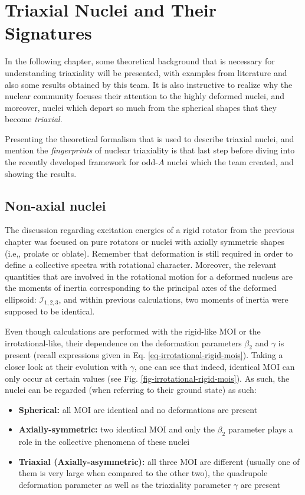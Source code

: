 \chapter{Triaxial Nuclei and Their Signatures}

In the following chapter, some theoretical background that is necessary for understanding triaxiality will be presented, with examples from literature and also some results obtained by this team. It is also instructive to realize why the nuclear community focuses their attention to the highly deformed nuclei, and moreover, nuclei which depart so much from the spherical shapes that they become \emph{triaxial}.

Presenting the theoretical formalism that is used to describe triaxial nuclei, and mention the \emph{fingerprints} of nuclear triaxiality is that last step before diving into the recently developed framework for odd-$A$ nuclei which the team created, and showing the results. 

\section{Non-axial nuclei}

The discussion regarding excitation energies of a rigid rotator from the previous chapter was focused on pure rotators or nuclei with axially symmetric shapes (i.e,, prolate or oblate). Remember that deformation is still required in order to define a collective spectra with rotational character. Moreover, the relevant quantities that are involved in the rotational motion for a deformed nucleus are the moments of inertia corresponding to the principal axes of the deformed ellipsoid: $\mathcal{I}_{1,2,3}$, and within previous calculations, two moments of inertia were supposed to be identical.

Even though calculations are performed with the rigid-like MOI or the irrotational-like, their dependence on the deformation parameters $\beta_2$ and $\gamma$ is present (recall expressions given in Eq. \ref{eq-irrotational-rigid-mois}). Taking a closer look at their evolution with $\gamma$, one can see that indeed, identical MOI can only occur at certain values (see Fig. \ref{fig-irrotational-rigid-mois}). As such, the nuclei can be regarded (when referring to their ground state) as such:
\begin{itemize}
    \item \textbf{Spherical:} all MOI are identical and no deformations are present
    \item \textbf{Axially-symmetric:} two identical MOI and only the $\beta_2$ parameter plays a role in the collective phenomena of these nuclei
    \item \textbf{Triaxial (Axially-asymmetric):} all three MOI are different (usually one of them is very large when compared to the other two), the quadrupole deformation parameter as well as the triaxiality parameter $\gamma$ are present
\end{itemize}


